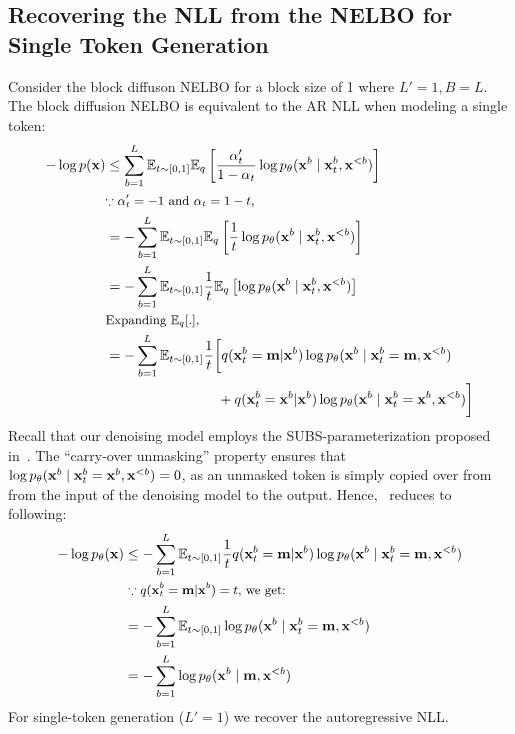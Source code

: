 \documentclass{article} %
\begin{document}
\subsection{Recovering the NLL from the NELBO for Single Token Generation} \label{supp:sar-block1-nll}
Consider the block diffuson NELBO for a block size of 1 where $L'=1, B=L$. The block diffusion NELBO is equivalent to the AR NLL when modeling a single token:
\begin{align}\label{eqn:supp:true-nll-part1}
    -\log p(\x) & \leq \sum_{b=1}^{L} \mathbb{E}_{t \sim [0, 1]} \mathbb{E}_{q} \left[ \frac{\at'}{1-\at} \log  p_\theta(\x^b \mid \x_t^b ,\x^{<b}) \right] \nonumber \\
    & \text{\footnotesize{$\because \at' = -1$ and $\at = 1-t$},} \nonumber \\ 
    &= -\sum_{b=1}^{L} \mathbb{E}_{t \sim [0, 1]} \mathbb{E}_{q} \left[ \frac{1}{t} \log p_\theta(\x^b \mid \x_t^b,\x^{<b})  \right] \nonumber \\
    &= -\sum_{b=1}^{L} \mathbb{E}_{t \sim [0, 1]}  \frac{1}{t} \mathbb{E}_{q} \left[ \log p_\theta(\x^b \mid \x_t^b,\x^{<b})  \right] \nonumber \\
    & \text{\footnotesize Expanding $\mathbb{E}_q[.]$,} \nonumber \\
    &= - \sum_{b=1}^{L} \mathbb{E}_{t \sim [0, 1]} \frac{1}{t} \bigg[ q(\x_t^b = \m | \x^b )\log p_\theta(\x^b \mid \x_t^b = \m,\x^{<b}) \nonumber \\
    &\hspace{8em} + q(\x_t^b = \x^b | \x^b ) \log p_\theta(\x^b \mid \x_t^b = \x^b,\x^{<b}) \bigg]
\end{align}
Recall that our denoising model employs the SUBS-parameterization proposed in~\citet{sahoo2024diffusion}. The ``carry-over unmasking'' property ensures that $\log p_\theta({\mathbf x}^b \mid {\mathbf x}_t^b = {\mathbf x}^b, {\mathbf x}^{<b})=0$, as an unmasked token is simply copied over from from the input of the denoising model to the output. Hence,~ reduces to following:
\begin{align}
    -\log \p(\x) &\leq - \sum_{b=1}^{L} \mathbb{E}_{t \sim [0, 1]} \frac{1}{t} q(\x_t^b = \m | \x^b) \log p_\theta(\x^b \mid \x_t^b = \m,\x^{<b})  \nonumber \\
    & \text{\footnotesize{ $\because q(\x^b_t = \m | \x^b) = t$, we get:}} \nonumber \\
    &= - \sum_{b=1}^{L} \mathbb{E}_{t \sim [0, 1]} \log p_\theta(\x^b \mid \x_t^b = \m,\x^{<b}) \nonumber \\
    &= - \sum_{b=1}^{L} \log p_\theta(\x^b \mid \m, \x^{<b})
\end{align}
For single-token generation ($L'=1$) we  recover the autoregressive NLL.
\end{document}

